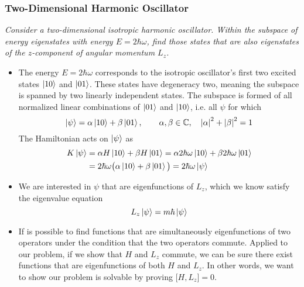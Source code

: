 \documentclass[11pt, a4paper]{article}
\begin{document}
\subsubsection{Two-Dimensional Harmonic Oscillator}
\textit{Consider a two-dimensional isotropic harmonic oscillator. Within the subspace of energy eigenstates with energy $ E = 2\hbar \omega $, find those states that are also eigenstates of the $ z $-component of angular momentum $ L_{z} $.}
\begin{itemize}
	\item The energy $ E = 2\hbar \omega $ corresponds to the isotropic oscillator's first two excited states $ \ket{10} $ and $ \ket{01} $. These states have degeneracy two, meaning the subspace is spanned by two linearly independent states. The subspace is formed of all normalized linear combinations of $ \ket{01} $ and $ \ket{10} $, i.e. all $ \psi $ for which
	\begin{equation*}
		\ket{\psi} = \alpha \ket{10} + \beta \ket{01}, \qquad \alpha, \beta \in \mathbb{C}, \quad \abs{\alpha}^{2} + \abs{\beta}^{2} = 1
	\end{equation*}
	The Hamiltonian acts on $ \ket{\psi} $ as
	\begin{align*}
		K \ket{\psi} &= \alpha H \ket{10} + \beta H \ket{01} = \alpha 2\hbar \omega \ket{10} + \beta 2\hbar \omega \ket{01}\\
		&=2\hbar \omega \big(\alpha \ket{10} + \beta \ket{01}\big) = 2\hbar \omega \ket{\psi}
	\end{align*}
	
	\item We are interested in $ \psi $ that are eigenfunctions of $ L_{z} $, which we know satisfy the eigenvalue equation
	\begin{equation*}
		L_{z}\ket{\psi} = m \hbar \ket{\psi}
	\end{equation*}
	
	\item If is possible to find functions that are simultaneously eigenfunctions of two operators under the condition that the two operators commute. Applied to our problem, if we show that $ H $ and $ L_{z} $ commute, we can be sure there exist functions that are eigenfunctions of both $ H $ and $ L_{z} $. In other words, we want to show our problem is solvable by proving $ \big[H, L_{z}\big] = 0 $. 
	

\end{itemize}
\end{document}
